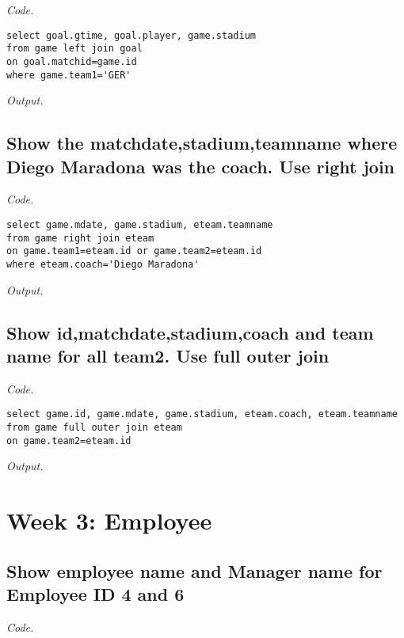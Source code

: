 \documentclass[12pt]{article}
\begin{document}
\textit{Code.}

\begin{lstlisting}
select goal.gtime, goal.player, game.stadium
from game left join goal
on goal.matchid=game.id
where game.team1='GER'
\end{lstlisting}

\textit{Output.}\\

\subsection{Show the matchdate,stadium,teamname where Diego Maradona was the coach. Use right join}

\textit{Code.}

\begin{lstlisting}
select game.mdate, game.stadium, eteam.teamname
from game right join eteam
on game.team1=eteam.id or game.team2=eteam.id
where eteam.coach='Diego Maradona'
\end{lstlisting}

\textit{Output.}\\

\subsection{Show id,matchdate,stadium,coach and team name for all team2. Use full outer join}

\textit{Code.}

\begin{lstlisting}
select game.id, game.mdate, game.stadium, eteam.coach, eteam.teamname
from game full outer join eteam
on game.team2=eteam.id
\end{lstlisting}

\textit{Output.}\\

\section{Week 3: Employee}

\subsection{Show employee name and Manager name for Employee ID 4 and 6}

\textit{Code.}
\end{document}
